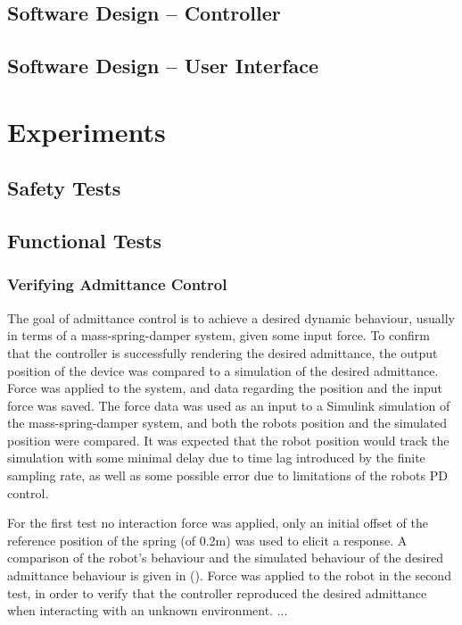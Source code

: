 \documentclass[12pt]{report}
\begin{document}
		
	\section{Software Design -- Controller}
	\section{Software Design -- User Interface} 
	
\chapter{Experiments}
	\section{Safety Tests}
	\section{Functional Tests}

	\subsection{Verifying Admittance Control}
		
	The goal of admittance control is to achieve a desired dynamic behaviour, usually in terms of a mass-spring-damper system, given some input force. To confirm that the controller is successfully rendering the desired admittance, the output position of the device was compared to a simulation of the desired admittance. Force was applied to the system, and data regarding the position and the input force was saved. The force data was used as an input to a Simulink simulation of the mass-spring-damper system, and both the robots position and the simulated position were compared. It was expected that the robot position would track the simulation with some minimal delay due to time lag introduced by the finite sampling rate, as well as some possible error due to limitations of the robots PD control. 
	
	For the first test no interaction force was applied, only an initial offset of the reference position of the spring (of 0.2m) was used to elicit a response. A comparison of the robot's behaviour and the simulated behaviour of the desired admittance behaviour is given in (). Force was applied to the robot in the second test, in order to verify that the controller reproduced the desired admittance when interacting with an unknown environment. ... 
	
\end{document}
